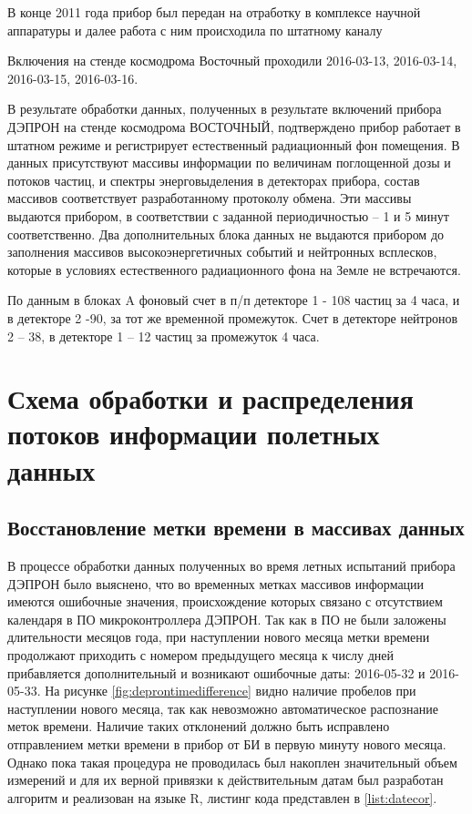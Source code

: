 В конце 2011 года прибор был передан на отработку в комплексе научной аппаратуры и далее работа с ним происходила по штатному каналу

Включения на стенде космодрома Восточный проходили  
2016-03-13,
2016-03-14,
2016-03-15,
2016-03-16.


В результате обработки данных, полученных в результате включений прибора ДЭПРОН на стенде космодрома ВОСТОЧНЫЙ, подтверждено прибор работает в штатном режиме и регистрирует естественный радиационный фон помещения.
В данных присутствуют массивы информации по величинам поглощенной дозы и потоков частиц, и спектры энерговыделения в детекторах прибора, состав массивов соответствует разработанному протоколу обмена. Эти массивы выдаются прибором, в соответствии с заданной периодичностью – 1 и 5 минут соответственно. Два дополнительных блока данных не выдаются прибором до заполнения массивов высокоэнергетичных событий и нейтронных всплесков, которые в условиях естественного радиационного фона на Земле не встречаются.

По данным в блоках A фоновый счет в п/п детекторе 1 - 108 частиц за 4 часа, и в детекторе 2 -90, за тот же временной промежуток. Счет в детекторе нейтронов 2 – 38, в детекторе 1 – 12 частиц за промежуток 4  часа.


\section{Схема обработки и распределения потоков информации полетных данных}\label{sec3.2}
\subsection{Восстановление метки времени в массивах данных}
В процессе обработки данных полученных во время летных испытаний прибора ДЭПРОН 
было выяснено, что во временных метках массивов информации имеются ошибочные 
значения, происхождение которых связано с отсутствием календаря в ПО 
микроконтроллера ДЭПРОН. Так как в ПО не были заложены длительности месяцов 
года, при наступлении нового месяца метки времени продолжают приходить с 
номером предыдущего месяца к числу дней прибавляется дополнительный и возникают 
ошибочные даты: 2016-05-32 и 2016-05-33. На рисунке 
\ref{fig:deprontimedifference} видно наличие пробелов при наступлении нового 
месяца, так как невозможно автоматическое распознание меток времени. Наличие 
таких отклонений должно быть 
исправлено отправлением метки времени в прибор от БИ в первую минуту нового 
месяца. Однако пока такая процедура не проводилась был накоплен значительный 
объем измерений и для их верной привязки к действительным датам был разработан 
алгоритм и реализован на языке R, листинг кода представлен в \ref{list:datecor}.

